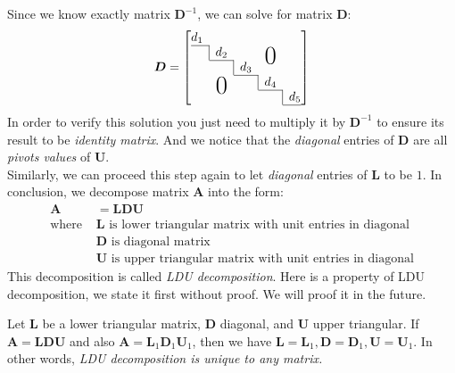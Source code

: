 Since we know exactly matrix $\bm D^{-1}$, we can
solve for matrix $\bm D$:
\[
\bm D=\left[
    \begin{array}{@{}ccccc@{}}
    d_1    &        &     &     &  \\ \cline{1-1}
    \bord & d_2       &    &  \bigzero   &  \\ \cline{2-2}
          & \bord    & d_3    &     &  \\ \cline{3-3}
          & \bigzero & \bord & d_4    &  \\ \cline{4-4}
          &          &       & \bord & d_5 \\ \cline{5-5}
  \end{array}\right]
\]
In order to verify this solution you just need to multiply it by $\bm D^{-1}$ to ensure its result to be
\textit{identity matrix}. And we notice that the \textit{diagonal} entries of $\bm D$ are all \textit{pivots values} of $\bm U$.\\
Similarly, we can proceed this step again to let \textit{diagonal} entries of $\bm L$ to be $1$.
In conclusion, we decompose matrix $\bm A$ into the form:
\begin{align*}
\bm A&=\bm L\bm D\bm U\\
\text{where }&\text{$\bm L$ is lower triangular matrix with unit entries in diagonal}\\
&\text{$\bm D$ is diagonal matrix}\\
&\text{$\bm U$ is upper triangular matrix with unit entries in diagonal}
\end{align*}
This decomposition is called \emph{LDU decomposition}. Here is a property of LDU decomposition,
we state it first without proof. We will proof it in the future.
\begin{proposition}
Let $\bm L$ be a lower triangular matrix, $\bm D$ diagonal, and $\bm U$ upper triangular. If
$\bm A=\bm{LDU}$ and also $\bm A=\bm L_1\bm D_1\bm U_1$, then we have $\bm L=\bm L_1,\bm D=\bm D_1,\bm U=\bm U_1$. In other words, \emph{LDU
decomposition is unique to any matrix.}
\end{proposition}
